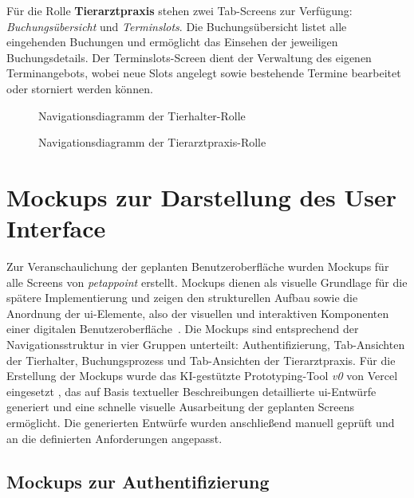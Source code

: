 Für die Rolle \textbf{Tierarztpraxis} stehen zwei Tab-Screens zur 
Verfügung: \textit{Buchungsübersicht} und \textit{Terminslots}. Die 
Buchungsübersicht listet alle eingehenden Buchungen und ermöglicht 
das Einsehen der jeweiligen Buchungsdetails. Der Terminslots-Screen 
dient der Verwaltung des eigenen Terminangebots, wobei neue Slots 
angelegt sowie bestehende Termine bearbeitet oder storniert werden 
können.

\begin{figure}[H]
    \centering
    
    \caption{Navigationsdiagramm der Tierhalter-Rolle}
    \label{fig:nav-tierhalter}
\end{figure}

\begin{figure}[H]
    \centering
    
    \caption{Navigationsdiagramm der Tierarztpraxis-Rolle}
    \label{fig:nav-tierarzt}
\end{figure}

\section{Mockups zur Darstellung des User Interface}

Zur Veranschaulichung der geplanten Benutzeroberfläche wurden Mockups 
für alle Screens von \textit{petappoint} erstellt. Mockups dienen als visuelle Grundlage \cite[S.~112]{pohl2021} für die spätere Implementierung und zeigen den strukturellen Aufbau sowie die Anordnung der \gls{ui}-Elemente, also der visuellen und interaktiven Komponenten einer digitalen
Benutzeroberfläche~\cite[S.~4]{galitz2002}. Die Mockups sind entsprechend der Navigationsstruktur in vier Gruppen unterteilt: Authentifizierung, Tab-Ansichten der Tierhalter, Buchungsprozess und Tab-Ansichten der Tierarztpraxis. Für die Erstellung der Mockups wurde das KI-gestützte Prototyping-Tool \textit{v0} von Vercel eingesetzt \cite{v0-vercel}, das auf Basis textueller Beschreibungen detaillierte \gls{ui}-Entwürfe generiert und eine schnelle visuelle Ausarbeitung der geplanten Screens ermöglicht. Die generierten Entwürfe wurden anschließend manuell geprüft und an die definierten Anforderungen angepasst.

\subsection{Mockups zur Authentifizierung}

